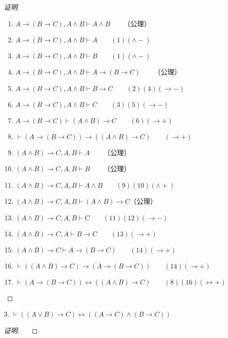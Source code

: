 \documentclass{article}
\begin{document}
\begin{CJK*}{UTF8}{gbsn}
\begin{proof}[证明]
      \begin{enumerate}
        \item $A\to (B\to C),A\land B\vdash A\land B\qquad$（公理）
        \item $A\to (B\to C),A\land B\vdash A\qquad(1)(\land -)$
        \item $A\to (B\to C),A\land B\vdash B\qquad(1)(\land -)$
        \item $A\to (B\to C),A\land B\vdash A\to (B\to C)\qquad$（公理）
        \item $A\to (B\to C),A\land B\vdash B\to C\qquad(2)(4)(\to -)$
        \item $A\to (B\to C),A\land B\vdash C\qquad(3)(5)(\to -)$
        \item $A\to (B\to C)\vdash (A\land B)\to C\qquad(6)(\to +)$
        \item $\vdash (A\to (B\to C))\to ((A\land B)\to C)\qquad (\to +)$
        \item $(A\land B)\to C,A,B\vdash A\qquad$（公理）
        \item $(A\land B)\to C,A,B\vdash B\qquad$（公理）
        \item $(A\land B)\to C,A,B\vdash A\land B\qquad(9)(10)(\land +)$
        \item $(A\land B)\to C,A,B\vdash (A\land B)\to C$（公理）
        \item $(A\land B)\to C,A,B\vdash C\qquad(11)(12)(\to -)$
        \item $(A\land B)\to C,A\vdash B\to C\qquad(13)(\to +)$
        \item $(A\land B)\to C\vdash A\to(B\to C)\qquad(14)(\to +)$
        \item $\vdash((A\land B)\to C)\to (A\to(B\to C))\qquad(14)(\to +)$
        \item $\vdash  (A\to (B\to C))\leftrightarrow ((A\land B)\to C)\qquad (8)(16)(\leftrightarrow +)$
      \end{enumerate}

    \end{proof}
    
    3. $\vdash ((A\lor B)\to C)\leftrightarrow((A\to C)\land (B\to C))$
    
    \begin{proof}[证明]
      
      $\quad$


\end{proof}
\end{CJK*}
\end{document}
